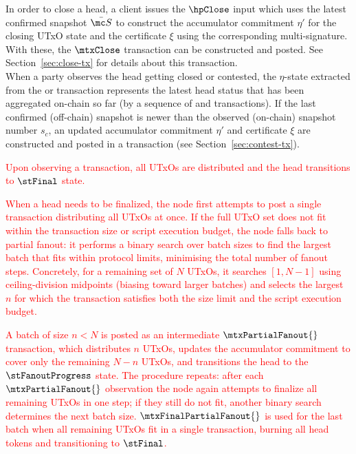 \quad In order to close a head, a client issues the
$\hpClose$ input which uses the latest confirmed snapshot $\bar{\mc S}$ to
construct the accumulator commitment $\eta'$ for the closing UTxO state
and the certificate $\xi$ using the corresponding multi-signature. With these, the $\mtxClose$ transaction
can be constructed and posted. See Section~\ref{sec:close-tx} for details about this
transaction. \\

\quad When a party observes
the head getting closed or contested, the $\eta$-state extracted from the
\mtxClose{} or \mtxContest{} transaction represents the latest head status that
has been aggregated on-chain so far (by a sequence of \mtxClose{} and
\mtxContest{} transactions). If the last confirmed (off-chain) snapshot is newer
than the observed (on-chain) snapshot number $s_{c}$, an updated accumulator
commitment $\eta'$ and certificate $\xi$ are constructed and posted in a \mtxContest{} transaction (see
Section~\ref{sec:contest-tx}).

\textcolor{red}{\quad Upon observing a \mtxFanout{}
transaction, all UTxOs are distributed and the head transitions to $\stFinal$ state.}

\textcolor{red}{}\quad \textcolor{red}{When a head needs to be finalized,
the node first attempts to post a single \mtxFanout{} transaction distributing all UTxOs at once.
If the full UTxO set does not fit within the transaction size or script execution budget, the node
falls back to partial fanout: it performs a binary search over batch sizes to find the largest
batch that fits within protocol limits, minimising the total number of fanout steps. Concretely, for
a remaining set of $N$ UTxOs, it searches $[1, N-1]$ using ceiling-division midpoints (biasing
toward larger batches) and selects the largest $n$ for which the transaction satisfies both the size
limit and the script execution budget.}

\textcolor{red}{A batch of size $n < N$ is posted as an intermediate $\mtxPartialFanout{}$ transaction, which
distributes $n$ UTxOs, updates the accumulator commitment to cover only the remaining $N - n$
UTxOs, and transitions the head to the $\stFanoutProgress$ state. The procedure repeats: after
each $\mtxPartialFanout{}$ observation the node again attempts to finalize all remaining UTxOs in
one step; if they still do not fit, another binary search determines the next batch size.
$\mtxFinalPartialFanout{}$ is used for the last batch when all remaining UTxOs fit in a single
transaction, burning all head tokens and transitioning to $\stFinal$.}

